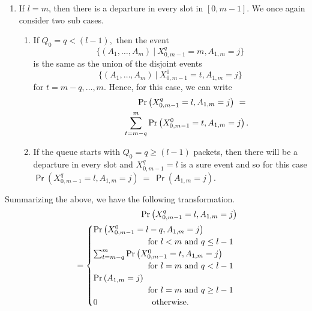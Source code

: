 \documentclass[11pt]{article}
\newcommand{\prob}[1]{\mathsf{\Pr}\left(#1\right)}
\begin{document}
\begin{enumerate}
\item If $l=m$, then there is a departure in every slot in $[0,m-1]. $
  We once again consider two sub cases.
  \begin{enumerate}
  \item If $Q_0 =q < (l-1),$ then the event 
    \begin{displaymath}
      \{(A_1, \ldots, A_m) \ | \ X_{0,m-1}^q=m, A_{1,m}=j \}
    \end{displaymath}
    is the same as the union of the disjoint events 
    \begin{displaymath}
    \{(A_1, \ldots, A_m) \ | \ X_{0,m-1}^0 = t, A_{1,m}=j \}   
    \end{displaymath}
    for $t= m-q,\ldots, m.$ Hence, for this case, we can write
    \begin{eqnarray*}
      && \prob{X_{0,m-1}^q=l, A_{1,m}=j} \ = \ \nonumber \\
      && \hspace{0.4in} \sum_{t=m-q}^{m} \prob{X_{0,m-1}^0=t, A_{1,m}
        =j}. 
    \end{eqnarray*}

  \item If the queue starts with $Q_0 =q \geq (l-1)$ packets, then
    there will be a departure in every slot and $X_{0,m-1}^q=l$ is a
    sure event and so for this case $\prob{X_{0,m-1}^q=l, A_{1,m}=j} \
    = \ \prob{A_{1,m}=j}$.
  \end{enumerate} 
\end{enumerate}
Summarizing the above, we have the following transformation.
\begin{eqnarray}
  && \hspace*{-9mm}\prob{X_{0,m-1}^q=l, A_{1,m}=j}  \  \ \nonumber \\
  &&
  = \begin{cases}  
    \prob{X_{0,m-1}^0=l-q, A_{1,m}=j} & \\
    \hspace{0.9in} \mbox{for $l < m$ and $q \leq  l-1$} \\ 
    \sum_{t=m-q}^{m} \prob{X_{0,m-1}^0=t, A_{1,m} =j} & \\
    \hspace{0.9in} \mbox{for $l=m$ and $q < l-1$}  \\
    \prob{A_{1,m}=j} & \\
    \hspace{0.9in} \mbox{for $l=m$ and $q \geq l-1$} \\
    0 \hspace{0.9in} \mbox{otherwise.}
  \end{cases} 
  \label{eq:transformations}
\end{eqnarray}
\end{document}
